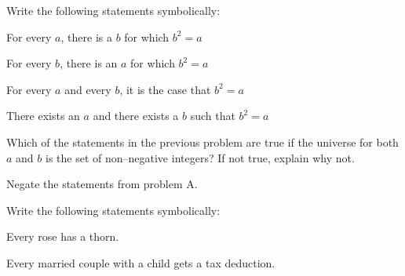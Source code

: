 \yourname


 Write the following statements symbolically:
\blist{0.4in}
\item For every $a$, there is a $b$ for which $b^2 = a$
\item For every $b$, there is an $a$ for which $b^2 = a$
\item For every $a$ and every $b$, it is the case that $b^2 = a$
\item There exists an $a$ and there exists a $b$ such that $b^2 = a$
\elist
\noindent 

 Which of the statements in the previous problem are true if the universe for both $a$ and $b$ is the set of non--negative integers?
If not true, explain why not.
\blist{0.2in}
\item
\item
\item
\item
\elist

 Negate the statements from problem A.
\blist{0.4in}
\item
\item
\item
\item
\elist

 Write the following statements symbolically:
\blist{0.5in}
\item Every rose has a thorn.
\item Every married couple with a child gets a tax deduction.
\elist

\vfill          %
